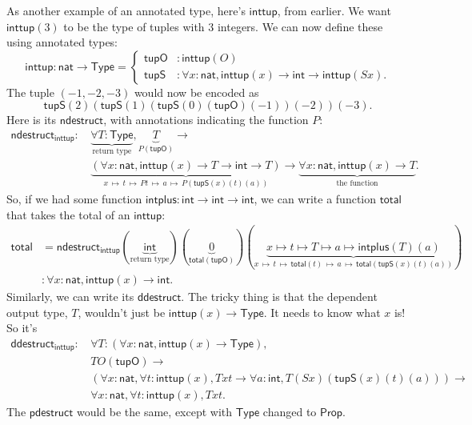 \documentclass[11pt,paper=letter]{scrartcl}
\newcommand{\sf}{\mathsf}
\newcommand{\prop}{\mathsf{Prop}}
\newcommand{\type}{\mathsf{Type}}
\newcommand{\smapsto}{\,\mapsto\,}
\begin{document}
As another example of an annotated type, here's $\sf{inttup}$, from earlier. We want $\sf{inttup}(3)$ to be the type of tuples with $3$ integers. We can now define these using annotated types: \[
  \sf{inttup} : \sf{nat} \to \type = \begin{cases}
  \sf{tupO} &: \sf{inttup}(O) \\
  \sf{tupS} &: \forall x: \sf{nat}, \sf{inttup}(x) \to \sf{int} \to \sf{inttup}(Sx).
  \end{cases}
\]
The tuple $(-1, -2, -3)$ would now be encoded as \[
  \sf{tupS}(2)(\sf{tupS}(1)(\sf{tupS}(0)(\sf{tupO})(-1))(-2))(-3).
\]
Here is its $\sf{ndestruct}$, with annotations indicating the function $P$:
\begin{align*}
\sf{ndestruct}_\sf{inttup}:\,
&\underbrace{\forall T: \type}_{\text{return type}},
\underbrace{T}_{P(\sf{tupO})} \to\\
&\underbrace{(\forall x: \sf{nat}, \sf{inttup}(x) \to T \to \sf{int} \to T)}_{x\smapsto t \smapsto Pt \smapsto a \smapsto P(\sf{tupS}(x)(t)(a))} \to
\underbrace{\forall x: \sf{nat}, \sf{inttup}(x) \to T}_{\text{the function}}.
\end{align*}
So, if we had some function $\sf{intplus} : \sf{int} \to \sf{int} \to \sf{int}$, we can write a function $\sf{total}$ that takes the total of an $\sf{inttup}$:
\begin{align*}
\sf{total} &=
\sf{ndestruct}_\sf{inttup}
(\underbrace{\sf{int}}_{\text{return type}})
(\underbrace{0}_{\sf{total}(\sf{tupO})})
(\underbrace{x \mapsto t \mapsto T \mapsto a \mapsto \sf{intplus}(T)(a)}_{x\smapsto t \smapsto \sf{total}(t) \smapsto a \smapsto \sf{total}(\sf{tupS}(x)(t)(a))}) \\
&: \forall x: \sf{nat}, \sf{inttup}(x) \to \sf{int}.
\end{align*}
Similarly, we can write its $\sf{ddestruct}$. The tricky thing is that the dependent output type, $T$, wouldn't just be $\sf{inttup}(x) \to \type$. It needs to know what $x$ is! So it's
\begin{align*}
\sf{ddestruct}_\sf{inttup}:\,
& \forall T: (\forall x: \sf{nat}, \sf{inttup}(x) \to \type),\\
& TO(\sf{tupO}) \to \\
& (\forall x: \sf{nat}, \forall t: \sf{inttup}(x), Txt \to \forall a: \sf{int}, T(Sx)(\sf{tupS}(x)(t)(a))) \to \\
& \forall x: \sf{nat}, \forall t: \sf{inttup}(x), Txt.
\end{align*}
The $\sf{pdestruct}$ would be the same, except with $\type$ changed to $\prop$.
\end{document}
